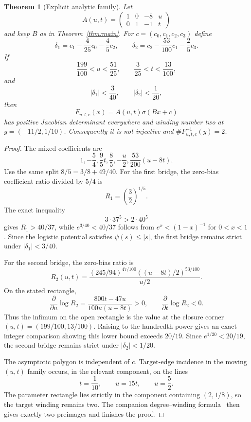 \documentclass[11pt]{article}
\newtheorem{theorem}{Theorem}[section]
\theoremstyle{remark}
\begin{document}
\begin{theorem}[Explicit analytic family]\label{thm:family}
Let
\[
 A(u,t)=\begin{pmatrix}
 1&0&-8&u\\
 0&1&-1&t
 \end{pmatrix}
\]
and keep $B$ as in Theorem~\ref{thm:main}. For $c=(c_0,c_1,c_2,c_3)$ define
\[
 \delta_1=c_1-\frac4{25}c_0-\frac45c_2,
 \qquad
 \delta_2=c_2-\frac{53}{100}c_1-\frac25c_3.
\]
If
\[
 \frac{199}{100}<u<\frac{51}{25},
 \qquad
 \frac3{25}<t<\frac{13}{100},
\]
and
\[
 |\delta_1|<\frac3{40},
 \qquad
 |\delta_2|<\frac1{20},
\]
then
\[
 F_{u,t,c}(x)=A(u,t)\sigma(Bx+c)
\]
has positive Jacobian determinant everywhere and winding number two at $y=(-11/2,1/10)$. Consequently it is not injective and $\#F_{u,t,c}^{-1}(y)=2$.
\end{theorem}

\begin{proof}
The mixed coefficients are
\[
 1,-\frac54,\frac95t,\frac85,-\frac u2,
 \frac{53}{200}(u-8t).
\]
Use the same split $8/5=3/8+49/40$. For the first bridge, the zero-bias coefficient ratio divided by $5/4$ is
\[
 R_1=\left(\frac32\right)^{1/5}.
\]
The exact inequality
\[
 3\cdot37^5>2\cdot40^5
\]
gives $R_1>40/37$, while $e^{3/40}<40/37$ follows from $e^x<(1-x)^{-1}$ for $0<x<1$. Since the logistic potential satisfies $\psi(s)\le |s|$, the first bridge remains strict under $|\delta_1|<3/40$.

For the second bridge, the zero-bias ratio is
\[
 R_2(u,t)=
 \frac{(245/94)^{47/100}((u-8t)/2)^{53/100}}{u/2}.
\]
On the stated rectangle,
\[
 \frac{\partial}{\partial u}\log R_2
 =\frac{800t-47u}{100u(u-8t)}>0,
 \qquad
 \frac{\partial}{\partial t}\log R_2<0.
\]
Thus the infimum on the open rectangle is the value at the closure corner $(u,t)=(199/100,13/100)$. Raising to the hundredth power gives an exact integer comparison showing this lower bound exceeds $20/19$. Since $e^{1/20}<20/19$, the second bridge remains strict under $|\delta_2|<1/20$.

The asymptotic polygon is independent of $c$. Target-edge incidence in the moving $(u,t)$ family occurs, in the relevant component, on the lines
\[
 t=\frac1{10},\qquad u=15t,\qquad u=\frac52.
\]
The parameter rectangle lies strictly in the component containing $(2,1/8)$, so the target winding remains two. The companion degree--winding formula~\cite{DixonPolygon} then gives exactly two preimages and finishes the proof.
\end{proof}
\end{document}
